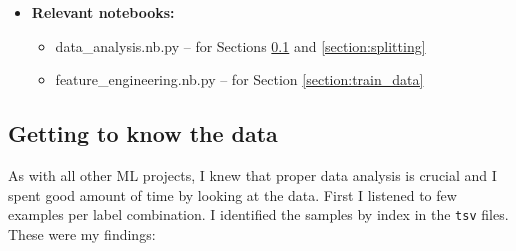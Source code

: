 \documentclass[11pt]{article}
\newcommand{\File}[1]{{\small\textsf{#1}}}
\begin{document}
\begin{itemize}
  \item[] \textbf{Relevant notebooks:}
    \begin{itemize}
      \item \File{data\_analysis.nb.py} -- for Sections \ref{section:getting_to_know_data} and \ref{section:splitting}
      \item \File{feature\_engineering.nb.py} -- for Section \ref{section:train_data}
    \end{itemize}
\end{itemize}

\subsection{Getting to know the data}\label{section:getting_to_know_data}

As with all other ML projects, I knew that proper data analysis is crucial and
I spent good amount of time by looking at the data. First I listened to few
examples per label combination. I identified the samples by index in the
\texttt{tsv} files. These were my findings:
\end{document}
